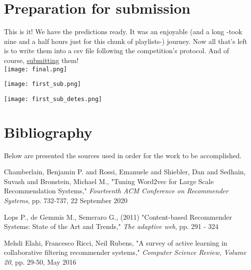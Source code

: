 \documentclass[]{article}
\begin{document}
\section{Preparation for submission}
This is it! We have the predictions ready. It was an enjoyable (and a long -took nine and a half hours just for this chunk of playlists-) journey. Now all that's left is to write them into a csv file following the competition's protocol. And of course, \href{https://www.aicrowd.com/9f000fa0-61d6-438f-9df7-62a205a3ef6c}{submitting} them!
\\
\texttt{[image: final.png]}

\texttt{[image: first\_sub.png]}

\texttt{[image: first\_sub\_detes.png]}

\section[papers used for research]{Bibliography}
Below are presented the sources used in order for the work to be accomplished.
\begin{thebibliography}{100}
	
	 Chamberlain, Benjamin P. and Rossi, Emanuele and Shiebler, Dan and Sedhain, Suvash and Bronstein, Michael M., "Tuning Word2vec for Large Scale Recommendation Systems," \emph{Fourteenth ACM Conference on Recommender Systems}, pp. 732-737, 22 September 2020  
	
	 Lops P., de Gemmis M., Semeraro G., (2011) "Content-based Recommender Systems: State of the Art and Trends," \emph{The adaptive web}, pp. 291 - 324
	
	  Mehdi Elahi, Francesco Ricci, Neil Rubens, "A survey of active learning in collaborative filtering recommender systems," \emph{Computer Science Review, Volume 20},  pp. 29-50, May 2016
\end{thebibliography}
\end{document}

